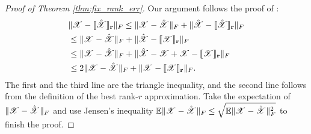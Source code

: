\begin{proof}[Proof of Theorem \ref{thm:fix_rank_err}]
Our argument follows the proof of \cite[Proposition 6.1]{tropp2017practical}:
\begin{equation}
\begin{aligned}
&\|\T{X} - \llbracket \hat{\T{X}} \rrbracket_\mathbf{r}\|_F \le \|\T{X} -  \hat{\T{X}}\|_F+\|\hat{\T{X}} -  \llbracket\hat{\T{X}}\rrbracket_\mathbf{r}\|_F\\
&\le \|\T{X} -  \hat{\T{X}}\|_F+\|\hat{\T{X}} -  \llbracket \T{X}\rrbracket_\mathbf{r}\|_F \\
& \le \|\T{X} -  \hat{\T{X}}\|_F+\|\hat{\T{X}} - \T{X}  + \T{X} - \llbracket \T{X}\rrbracket_\mathbf{r}\|_F \\
&\le 2\|\T{X} - \hat{\T{X}} \|_F + \|\T{X} -  \llbracket \T{X} \rrbracket_\mathbf{r}\|_F.\nonumber
\end{aligned}
\end{equation}
The first and the third line are the triangle inequality,
and the second line follows from the definition of the best rank-$r$ approximation.
Take the expectation of $\|\T{X} - \hat{\T{X}} \|_F$ and
use Jensen's inequality $\mathbb{E}\|\T{X} - \hat{\T{X}} \|_F \le \sqrt{\mathbb{E} \|\T{X} - \hat{\T{X}} \|_F^2}$
to finish the proof.
\end{proof}
